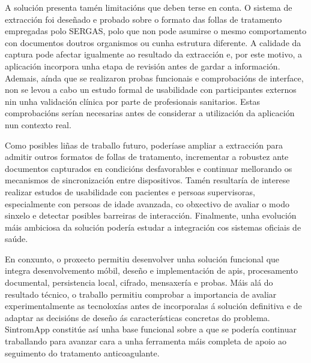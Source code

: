 A solución presenta tamén limitacións que deben terse en conta. O sistema de extracción foi deseñado e probado sobre o formato das follas de tratamento empregadas polo SERGAS, polo que non pode asumirse o mesmo comportamento con documentos doutros organismos ou cunha estrutura diferente. A calidade da captura pode afectar igualmente ao resultado da extracción e, por este motivo, a aplicación incorpora unha etapa de revisión antes de gardar a información. Ademais, aínda que se realizaron probas funcionais e comprobacións de interface, non se levou a cabo un estudo formal de usabilidade con participantes externos nin unha validación clínica por parte de profesionais sanitarios. Estas comprobacións serían necesarias antes de considerar a utilización da aplicación nun contexto real.

Como posibles liñas de traballo futuro, poderíase ampliar a extracción para admitir outros formatos de follas de tratamento, incrementar a robustez ante documentos capturados en condicións desfavorables e continuar mellorando os mecanismos de sincronización entre dispositivos. Tamén resultaría de interese realizar estudos de usabilidade con pacientes e persoas supervisoras, especialmente con persoas de idade avanzada, co obxectivo de avaliar o modo sinxelo e detectar posibles barreiras de interacción. Finalmente, unha evolución máis ambiciosa da solución podería estudar a integración cos sistemas oficiais de saúde.

En conxunto, o proxecto permitiu desenvolver unha solución funcional que integra desenvolvemento móbil, deseño e implementación de \glspl{api}, procesamento documental, persistencia local, cifrado, mensaxería e probas. Máis alá do resultado técnico, o traballo permitiu comprobar a importancia de avaliar experimentalmente as tecnoloxías antes de incorporalas á solución definitiva e de adaptar as decisións de deseño ás características concretas do problema. SintromApp constitúe así unha base funcional sobre a que se podería continuar traballando para avanzar cara a unha ferramenta máis completa de apoio ao seguimento do tratamento anticoagulante.